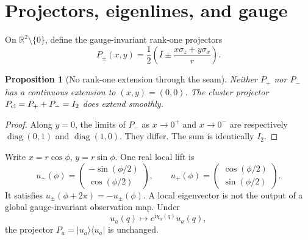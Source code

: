\documentclass[11pt,a4paper]{article}
\theoremstyle{definition}
\theoremstyle{plain}
\newtheorem{proposition}[definition]{Proposition}
\theoremstyle{remark}
\newcommand{\R}{\mathbb{R}}
\newcommand{\I}{\mathrm i}
\begin{document}
\section{Projectors, eigenlines, and gauge}

On \(\R^2\setminus\{0\}\), define the gauge-invariant rank-one
projectors
\begin{equation}\label{eq:rank-one-projectors}
P_\pm(x,y)
=\frac12\left(I\pm\frac{x\sigma_z+y\sigma_x}{r}\right).
\end{equation}

\begin{proposition}[No rank-one extension through the seam]
\label{prop:no-projector-extension}
Neither \(P_+\) nor \(P_-\) has a continuous extension to
\((x,y)=(0,0)\).  The cluster projector
\(P_{\rm cl}=P_++P_-=I_2\) does extend smoothly.
\end{proposition}

\begin{proof}
Along \(y=0\), the limits of \(P_-\) as \(x\to0^+\) and \(x\to0^-\)
are respectively
\(\operatorname{diag}(0,1)\) and
\(\operatorname{diag}(1,0)\). They differ. The sum is identically
\(I_2\).
\end{proof}

Write \(x=r\cos\phi\), \(y=r\sin\phi\). One real local lift is
\begin{equation}\label{eq:real-eigenvectors}
u_-(\phi)=
\begin{pmatrix}-\sin(\phi/2)\\ \cos(\phi/2)\end{pmatrix},
\qquad
u_+(\phi)=
\begin{pmatrix}\cos(\phi/2)\\ \sin(\phi/2)\end{pmatrix}.
\end{equation}
It satisfies \(u_\pm(\phi+2\pi)=-u_\pm(\phi)\).  A local eigenvector
is not the output of a global gauge-invariant observation map.
Under
\[
u_a(q)\longmapsto e^{\I\chi_a(q)}u_a(q),
\]
the projector \(P_a=\lvert u_a\rangle\langle u_a\rvert\) is unchanged.

\begin{center}
\end{center}
\end{document}
